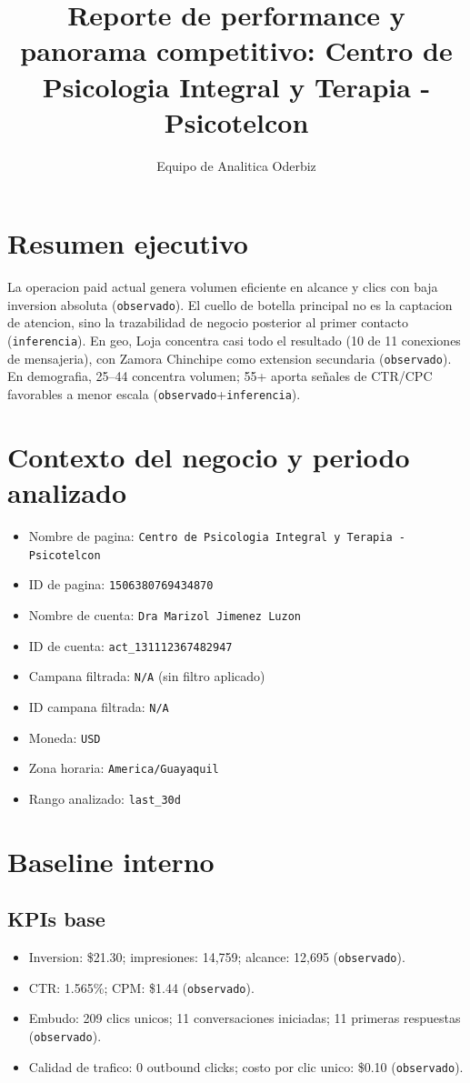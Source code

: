 \documentclass[9pt,a4paper,twocolumn,twoside]{tau-class/tau}
\title{Reporte de performance y panorama competitivo: Centro de Psicologia Integral y Terapia - Psicotelcon}
\author[a,1]{Equipo de Analitica Oderbiz}
\affil[a]{Unidad de Inteligencia Comercial}
\begin{document}
\maketitle
\thispagestyle{firststyle}

\section{Resumen ejecutivo}

La operacion paid actual genera volumen eficiente en alcance y clics con baja inversion absoluta (\texttt{observado}). El cuello de botella principal no es la captacion de atencion, sino la trazabilidad de negocio posterior al primer contacto (\texttt{inferencia}). En geo, Loja concentra casi todo el resultado (10 de 11 conexiones de mensajeria), con Zamora Chinchipe como extension secundaria (\texttt{observado}). En demografia, 25--44 concentra volumen; 55+ aporta señales de CTR/CPC favorables a menor escala (\texttt{observado}+\texttt{inferencia}).

\section{Contexto del negocio y periodo analizado}

\begin{itemize}
  \item Nombre de pagina: \texttt{Centro de Psicologia Integral y Terapia - Psicotelcon}
  \item ID de pagina: \texttt{1506380769434870}
  \item Nombre de cuenta: \texttt{Dra Marizol Jimenez Luzon}
  \item ID de cuenta: \texttt{act\_131112367482947}
  \item Campana filtrada: \texttt{N/A} (sin filtro aplicado)
  \item ID campana filtrada: \texttt{N/A}
  \item Moneda: \texttt{USD}
  \item Zona horaria: \texttt{America/Guayaquil}
  \item Rango analizado: \texttt{last\_30d}
\end{itemize}

\section{Baseline interno}

\subsection{KPIs base}
\begin{itemize}
  \item Inversion: \$21.30; impresiones: 14{,}759; alcance: 12{,}695 (\texttt{observado}).
  \item CTR: 1.565\%; CPM: \$1.44 (\texttt{observado}).
  \item Embudo: 209 clics unicos; 11 conversaciones iniciadas; 11 primeras respuestas (\texttt{observado}).
  \item Calidad de trafico: 0 outbound clicks; costo por clic unico: \$0.10 (\texttt{observado}).
\end{itemize}
\end{document}
